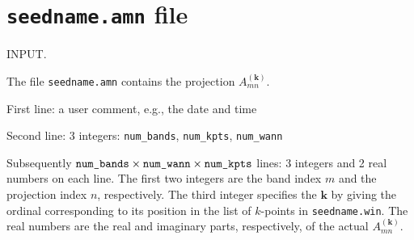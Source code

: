 \section{{\tt seedname.amn} file}

INPUT.

The file \verb#seedname.amn# contains the projection
$A_{mn}^{(\mathbf{k})}$.

First line: a user comment, e.g., the date and time


Second line: 3 integers: \verb#num_bands#, \verb#num_kpts#, \verb#num_wann#

                                     
Subsequently
$\verb#num_bands#\times\verb#num_wann#\times\verb#num_kpts#$ 
lines: 3 integers and 2 real numbers on each line. The first 
two integers are the band index $m$ and the projection index $n$, respectively. The third integer specifies
the $\mathbf{k}$ by giving the ordinal corresponding to its position
in the list of $k$-points in \verb#seedname.win#. The real numbers
are the real and imaginary parts, respectively, of the actual
$A_{mn}^{(\mathbf{k})}$.



